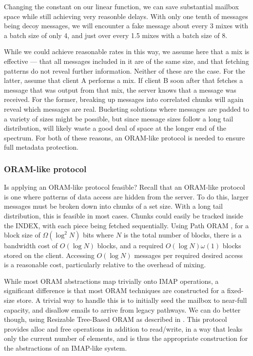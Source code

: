 \documentclass[pageno]{jpaper}
\begin{document}
Changing the constant on our linear function, we can save substantial mailbox space while still achieving very reasonble delays. With only one tenth of messages being decoy messages, we will encounter a fake message about every 3 mixes with a batch size of only 4, and just over every 1.5 mixes with a batch size of 8.

While we could achieve reasonable rates in this way, we assume here that a mix is effective \---- that all messages included in it are of the same size, and that fetching patterns do not reveal further information. Neither of these are the case. For the latter, assume that client A performs a mix. If client B soon after that fetches a message that was output from that mix, the server knows that a message was received. For the former, breaking up messages into correlated chunks will again reveal which messages are real. Bucketing solutions where messages are padded to a variety of sizes might be possible, but since message sizes follow a long tail distribution, will likely waste a good deal of space at the longer end of the spectrum. For both of these reasons, an ORAM-like protocol is needed to ensure full metadata protection.


\subsubsection{ORAM-like protocol}

Is applying an ORAM-like protocol feasible? Recall that an ORAM-like protocol is one where patterns of data access are hidden from the server. To do this, larger messages must be broken down into chunks of a set size. With a long tail distribution, this is feasible in most cases. Chunks could easily be tracked inside the INDEX, with each piece being fetched sequentially. Using Path ORAM \cite{stefanov2013path}, for a block size of $\Omega (\log ^2 N)$ bits where $N$ is the total number of blocks, there is a bandwidth cost of $O(\log N)$ blocks, and a required $O(\log N)\omega(1)$ blocks stored on the client. Accessing $O(\log N)$ messages per required desired access is a reasonable cost, particularly relative to the overhead of mixing.

While most ORAM abstractions map trivially onto IMAP operations, a significant difference is that most ORAM techniques are constructed for a fixed-size store. A trivial way to handle this is to initially seed the mailbox to near-full capacity, and disallow emails to arrive from legacy pathways. We can do better though, using Resizable Tree-Based ORAM as described in \cite{moatazresizable}. This protocol provides alloc and free operations in addition to read/write, in a way that leaks only the current number of elements, and is thus the appropriate construction for the abstractions of an IMAP-like system.
\end{document}
